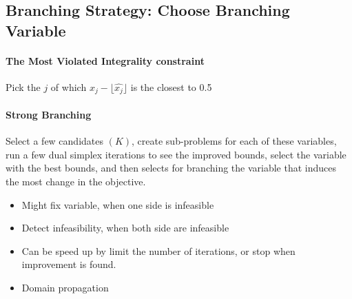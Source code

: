         \subsection{Branching Strategy: Choose Branching Variable}
                
            \paragraph{The Most Violated Integrality constraint}
                Pick the $j$ of which $x_j - \lfloor \hat{x_j} \rfloor$ is the closest to 0.5

            \paragraph{Strong Branching}
                Select a few candidates $(K)$, create sub-problems for each of these variables, run a few dual simplex iterations to see the improved bounds, select the variable with the best bounds, and then selects for branching the variable that induces the most change in the objective.

                \begin{itemize}
                    \item Might fix variable, when one side is infeasible
                    \item Detect infeasibility, when both side are infeasible
                    \item Can be speed up by limit the number of iterations, or stop when improvement is found.
                    \item Domain propagation
                \end{itemize}

